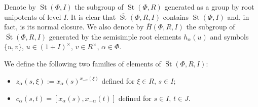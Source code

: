\documentclass[oneside, 8pt]{amsart}
\theoremstyle{remark}
\theoremstyle{definition}
\numberwithin{lemma}{section}
\numberwithin{prop}{section}
\numberwithin{corollary}{section}
\DeclareMathOperator{\St}{St}
\numberwithin{equation}{section}
\begin{document}
Denote by $\St(\Phi, I)$ the subgroup of $\St(\Phi, R)$ generated as a group by root unipotents of level $I$.
It is clear that $\overline{\St}(\Phi, R, I)$ contains $\St(\Phi, I)$ and, in fact, is its normal closure.
We also denote by $\overline{H}(\Phi, R, I)$ the subgroup of $\overline{\St}(\Phi, R, I)$ generated by the semisimple root elements $h_\alpha(u)$ and symbols $\{u, v\}$, $u \in (1+I)^\times$, $v \in R^\times$, $\alpha\in \Phi$.

We define the following two families of elements of $\overline{\St}(\Phi, R, I)$:
\begin{itemize}
 \item $z_\alpha(s, \xi) := x_\alpha(s)^{x_{-\alpha}(\xi)}$ defined for $\xi \in R$, $s \in I$;
 \item $c_\alpha(s, t) = [x_\alpha(s), x_{-\alpha}(t)]$ defined for $s \in I$, $t \in J$.
\end{itemize}
\end{document}
